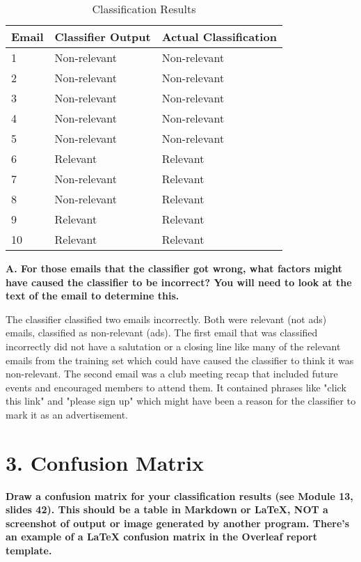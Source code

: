 \documentclass[12pt]{article}
\begin{document}
\begin{table}[h]
\centering
\caption{Classification Results}
\label{tbl:simple}
\begin{tabular}{|l|l|l|}
\hline
\textbf{Email} & \textbf{Classifier Output} & \textbf{Actual Classification} \\ \hline \hline
1 & Non-relevant & Non-relevant \\ \hline
2 & Non-relevant & Non-relevant \\ \hline
3 & Non-relevant & Non-relevant \\ \hline
4 & Non-relevant & Non-relevant \\ \hline
5 & Non-relevant & Non-relevant \\ \hline
6 & Relevant & Relevant \\ \hline
7 & Non-relevant & Relevant \\ \hline
8 & Non-relevant & Relevant \\ \hline
9 & Relevant & Relevant \\ \hline
10 & Relevant & Relevant \\ \hline
\end{tabular}
\end{table}

\noindent \textbf{A. For those emails that the classifier got wrong, what factors might have caused the classifier to be incorrect? You will need to look at the text of the email to determine this.}

The classifier classified two emails incorrectly. Both were relevant (not ads) emails, classified as non-relevant (ads). The first email that was classified incorrectly did not have a salutation or a closing line like many of the relevant emails from the training set which could have caused the classifier to think it was non-relevant. The second email was a club meeting recap that included future events and encouraged members to attend them. It contained phrases like "click this link" and "please sign up" which might have been a reason for the classifier to mark it as an advertisement. 

\section*{3. Confusion Matrix}
\noindent \textbf{Draw a confusion matrix for your classification results (see Module 13, slides 42).
This should be a table in Markdown or LaTeX, NOT a screenshot of output or image generated by another program. There's an example of a LaTeX confusion matrix in the Overleaf report template.}
\end{document}
